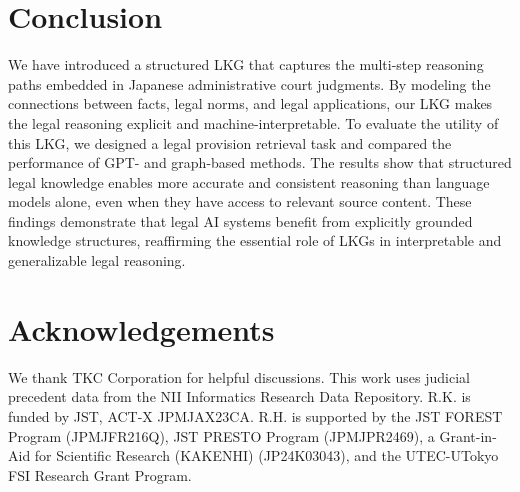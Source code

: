 \documentclass[11pt]{article}
\begin{document}
\section{Conclusion}
We have introduced a structured LKG that captures the multi-step reasoning paths embedded in Japanese administrative court judgments. By modeling the connections between facts, legal norms, and legal applications, our LKG makes the legal reasoning explicit and machine-interpretable. To evaluate the utility of this LKG, we designed a legal provision retrieval task and compared the performance of GPT- and graph-based methods. The results show that structured legal knowledge enables more accurate and consistent reasoning than language models alone, even when they have access to relevant source content. These findings demonstrate that legal AI systems benefit from explicitly grounded knowledge structures, reaffirming the essential role of LKGs in interpretable and generalizable legal reasoning.




\section{Acknowledgements}
We thank TKC Corporation for helpful discussions. This work uses judicial precedent data from the NII Informatics Research Data Repository. R.K. is funded by JST, ACT-X JPMJAX23CA. R.H. is supported by the JST FOREST Program (JPMJFR216Q), JST PRESTO Program (JPMJPR2469), a Grant-in-Aid for Scientific Research (KAKENHI) (JP24K03043), and the UTEC-UTokyo FSI Research Grant Program. 




\end{document}
